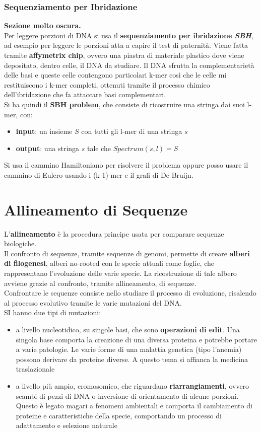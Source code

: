 \documentclass[a4paper,12pt, oneside]{book}
\begin{document}
\subsection{Sequenziamento per Ibridazione}
\textbf{Sezione molto oscura.}\\
Per leggere porzioni di DNA si usa il \textbf{sequenziamento per ibridazione
  \textit{SBH}}, ad esempio per leggere le porzioni atta a capire il test di
paternità. Viene fatta tramite \textbf{affymetrix chip}, ovvero una piastra di
materiale plastico dove viene depositato, dentro celle, il DNA da studiare. Il
DNA sfrutta la complementarietà delle basi e queste celle contengono particolari
k-mer così che le celle mi restituiscono i k-mer completi, ottenuti tramite il
processo chimico dell'ibridazione che fa attaccare basi complementari.\\
Si ha quindi il \textbf{SBH problem}, che consiste di ricostruire una stringa
dai suoi l-mer, con:
\begin{itemize}
  \item \textbf{input}: un insieme $S$ con tutti gli l-mer di una stringa $s$
  \item \textbf{output}: una stringa $s$ tale che $Spectrum(s,l)=S$
\end{itemize}
Si usa il cammino Hamiltoniano per risolvere il problema oppure posso usare il
cammino di Eulero usando i (k-1)-mer e il grafi di De Bruijn.

\chapter{Allineamento di Sequenze}
L'\textbf{allineamento} è la procedura principe usata per comparare sequenze
biologiche. \\
Il confronto di sequenze, tramite sequenze di genomi, permette di creare
\textbf{alberi di filogenesi}, alberi no-rooted con le specie attuali come
foglie, che rappresentano l'evoluzione delle varie specie. La ricostruzione di
tale albero avviene grazie al confronto, tramite allineamento, di sequenze.\\
Confrontare le sequenze consiste nello studiare il processo di evoluzione,
risalendo al processo evolutivo tramite le varie mutazioni del DNA.\\
SI hanno due tipi di mutazioni:
\begin{itemize}
  \item a livello nucleotidico, su singole basi, che sono \textbf{operazioni di
    edit}. Una singola base comporta la creazione di una diversa proteina e
  potrebbe portare a varie patologie. Le varie forme di una malattia genetica
  (tipo l'anemia) possono derivare da proteine diverse. A questo tema si
  affianca la medicina traslazionale
  \item a livello più ampio, cromosomico, che riguardano
  \textbf{riarrangiamenti}, ovvero scambi di pezzi di DNA o inversione di
  orientamento di alcune porzioni. Questo è legato magari a fenomeni ambientali
  e comporta il cambiamento di proteine e caratteristiche della specie,
  comportando un processo di adattamento e selezione naturale
\end{itemize}
\end{document}
